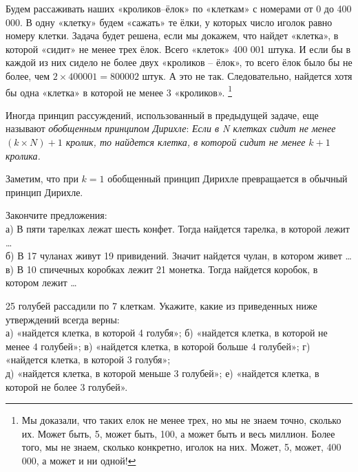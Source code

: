 \begin{prf}
	Будем рассаживать наших «кроликов–ёлок» по «клеткам» с номерами от 0 до 400 000. В одну «клетку» будем «сажать» те ёлки, у которых число иголок равно номеру клетки. Задача будет решена, если мы докажем, что найдет «клетка», в которой «сидит» не менее трех ёлок. Всего «клеток» 400 001 штука. И если бы в каждой из них сидело не более двух «кроликов – ёлок», то всего ёлок было бы не более, чем  $2\times400001=800002$ штук. А это не так. Следовательно, найдется хотя бы одна «клетка» в которой не менее 3 «кроликов». \footnote{Мы доказали, что таких елок не менее трех, но мы не знаем точно, сколько их. Может быть, 5, может быть, 100, а может быть и весь миллион. Более того, мы не знаем, сколько конкретно, иголок на них. Может, 5, может, 400 000, а может и ни одной!}
\end{prf}

Иногда принцип рассуждений, использованный в предыдущей задаче, еще называют \textit{обобщенным принципом Дирихле}: \textit{Если в N клетках сидит не менее $(k\times N)+1$ кролик, то найдется клетка, в которой сидит не менее $k+1$ кролика.}

Заметим, что при $k =1$ обобщенный принцип Дирихле превращается в обычный принцип Дирихле.

\begin{ex}\label{u12}
	Закончите предложения:\\
	а) В пяти тарелках лежат шесть конфет. Тогда найдется тарелка, в которой лежит \dots\\
	б) В 17 чуланах живут 19 привидений. Значит найдется чулан, в котором живет \dots\\
	в) В 10 спичечных коробках лежит 21 монетка. Тогда найдется коробок, в котором лежит \dots	
\end{ex}

\begin{ex}\label{u13}	25 голубей рассадили по 7 клеткам. Укажите, какие из приведенных ниже утверждений всегда верны: \\
	а) «найдется клетка, в которой 4 голубя»;     б) «найдется клетка, в которой не менее 4 голубей»;
	в) «найдется клетка, в которой больше 4 голубей»; г) «найдется клетка, в которой 3 голубя»;\\
	д) «найдется клетка, в которой меньше 3 голубей»; е) «найдется клетка, в которой не более 3 голубей».
\end{ex}